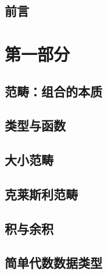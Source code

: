


\frontmatter
\tableofcontents


\chapter*{前言}
\label{Preface}


\mainmatter

\part*{第一部分}

\chapter{范畴：组合的本质}\label{category-the-essence-of-composition}


\chapter{类型与函数}\label{types-and-functions}


\chapter{大小范畴}\label{categories-great-and-small}


\chapter{克莱斯利范畴}\label{kleisli-categories}


\chapter{积与余积}\label{products-and-coproducts}


\chapter{简单代数数据类型}\label{simple-algebraic-data-types}


